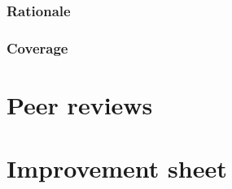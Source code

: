 \documentclass[10pt]{article}
\begin{document}
      \subsubsection{Rationale}

      \subsubsection{Coverage}
        

  \section{Peer reviews}

  \section{Improvement sheet}
\end{document}
